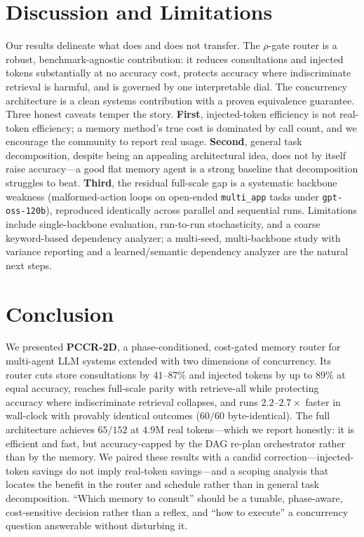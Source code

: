 \documentclass[10pt,twocolumn]{article}
\newcommand{\code}[1]{\texttt{\small #1}}
\begin{document}
\section{Discussion and Limitations}
Our results delineate what does and does not transfer. The $\rho$-gate router is a robust,
benchmark-agnostic contribution: it reduces consultations and injected tokens substantially at no
accuracy cost, protects accuracy where indiscriminate retrieval is harmful, and is governed by one
interpretable dial. The concurrency architecture is a clean systems contribution with a proven
equivalence guarantee. Three honest caveats temper the story. \textbf{First}, injected-token efficiency
is not real-token efficiency; a memory method's true cost is dominated by call count, and we encourage
the community to report real usage. \textbf{Second}, general task decomposition, despite being an
appealing architectural idea, does not by itself raise accuracy---a good flat memory agent is a strong
baseline that decomposition struggles to beat. \textbf{Third}, the residual full-scale gap is a
systematic backbone weakness (malformed-action loops on open-ended \code{multi\_app} tasks under
\code{gpt-oss-120b}), reproduced identically across parallel and sequential runs. Limitations include
single-backbone evaluation, run-to-run stochasticity, and a coarse keyword-based dependency analyzer; a
multi-seed, multi-backbone study with variance reporting and a learned/semantic dependency analyzer are
the natural next steps.

\section{Conclusion}
We presented \textbf{PCCR-2D}, a phase-conditioned, cost-gated memory router for multi-agent LLM
systems extended with two dimensions of concurrency. Its router cuts store consultations by
$41$--$87\%$ and injected tokens by up to $89\%$ at equal accuracy, reaches full-scale parity with
retrieve-all while protecting accuracy where indiscriminate retrieval collapses, and runs
$2.2$--$2.7\times$ faster in wall-clock with provably identical outcomes ($60/60$ byte-identical). The
full architecture achieves $65/152$ at $4.9$M real tokens---which we report honestly: it is efficient
and fast, but accuracy-capped by the DAG re-plan orchestrator rather than by the memory. We paired
these results with a candid correction---injected-token savings do not imply real-token savings---and a
scoping analysis that locates the benefit in the router and schedule rather than in general task
decomposition. ``Which memory to consult'' should be a tunable, phase-aware, cost-sensitive decision
rather than a reflex, and ``how to execute'' a concurrency question answerable without disturbing it.
\end{document}
